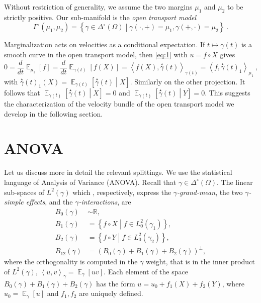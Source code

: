 \documentclass[runningheads]{llncs}
\DeclareMathOperator{\Expectation}{\mathbb E}
\newcommand{\condexpectat}[3]{{\Expectation}_{#1}\left[#2 \middle| #3\right]}
\newcommand{\derivby}[1]{\frac{d}{d#1}}
\newcommand{\expectat}[2]{{\Expectation}_{#1}\left[#2\right]}
\newcommand{\reals}{\mathbb R}
\newcommand{\scalarat}[3]{\left\langle #2 , #3 \right\rangle_{#1}}
\newcommand{\setof}[2]{\left\{ #1 \middle| #2 \right\}}
\newcommand{\velocity}[1]{\overset{\star}{#1}}
\begin{document}
Without restriction of generality, we assume the two margins $\mu_1$ and $\mu_2$ to be strictly positive. Our sub-manifold is the \emph{open transport model}
\begin{equation*} \Gamma^\circ(\mu_1,\mu_2) = \setof{\gamma \in \Delta^\circ(\Omega)}{\gamma(\cdot,+) = \mu_1, \gamma(+,\cdot) = \mu_2} \ .
\end{equation*}

Marginalization acts on velocities as a conditional expectation. If $t \mapsto \gamma(t)$ is a smooth curve in the open transport model, then \cref{eq:1} with $u = f \circ X$ gives \begin{equation*} 0 = \derivby t \expectat {\mu_1} f =  \derivby t \expectat {\gamma(t)} {f(X)} = \scalarat {\gamma(t)}  {f(X)} {\velocity \gamma(t)} = \scalarat {\mu_1}  f {{\velocity \gamma(t)}_1} \ , \end{equation*} with ${\velocity \gamma(t)}_1(X) = \condexpectat {\gamma(t)} {\velocity \gamma(t)} X$. Similarly on the other projection. It follows that $\condexpectat {\gamma(t)} {\velocity \gamma(t)} X = 0$ and $\condexpectat {\gamma(t)} {\velocity \gamma(t)} Y = 0$. This suggests the characterization of the velocity bundle of the open transport model we develop in the following section.

\section{ANOVA}

Let us discuss more in detail the relevant splittings. We use the statistical language of Analysis of Variance (ANOVA). Recall that $\gamma \in \Delta^\circ(\Omega)$. The linear sub-spaces of $L^2(\gamma)$ which , respectively, express the \emph{$\gamma$-grand-mean}, the two \emph{$\gamma$-simple effects}, and the \emph{$\gamma$-interactions}, are
\begin{equation}\label{eq:ANOVA-spaces} \begin{aligned} B_0(\gamma) &\sim \reals, \\ B_1(\gamma) &= \setof{f\circ X}{f \in L^2_0(\gamma_1)},\\ B_2(\gamma) &= \setof{f\circ Y}{f \in L^2_0(\gamma_2)},\\ B_{12}(\gamma) &= (B_0(\gamma) + B_1(\gamma) + B_2(\gamma))^\perp, \end{aligned} \end{equation}
where the orthogonality is computed in the $\gamma$ weight, that is in the inner product of $L^2(\gamma)$, $\scalarat \gamma u v = \expectat \gamma {uv}$. Each element of the space $B_0(\gamma) + B_1(\gamma) + B_2(\gamma)$ has the form $u = u_0 + f_1(X) + f_2(Y)$, where $u_0 = \expectat \gamma u$ and $f_1,f_2$ are uniquely defined. 
\end{document}
